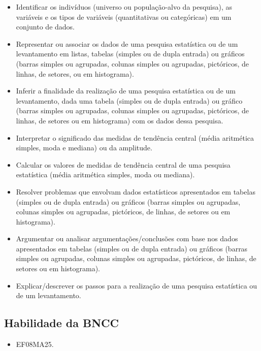 \begin{itemize}
\item Identificar os indivíduos (universo ou
população-alvo da pesquisa), as variáveis e os tipos de variáveis
(quantitativas ou categóricas) em um conjunto de dados.
\item
  Representar ou associar os dados de uma pesquisa estatística ou de um
  levantamento em listas, tabelas (simples ou de dupla entrada) ou
  gráficos (barras simples ou agrupadas, colunas simples ou agrupadas,
  pictóricos, de linhas, de setores, ou em histograma).
\item
  Inferir a finalidade da realização de uma pesquisa estatística ou de
  um levantamento, dada uma tabela (simples ou de dupla entrada) ou
  gráfico (barras simples ou agrupadas, colunas simples ou agrupadas,
  pictóricos, de linhas, de setores ou em histograma) com os dados dessa
  pesquisa.
\item
  Interpretar o significado das medidas de tendência central (média
  aritmética simples, moda e mediana) ou da amplitude.
\item
  Calcular os valores de medidas de tendência central de uma pesquisa
  estatística (média aritmética simples, moda ou mediana).
\item
  Resolver problemas que envolvam dados estatísticos apresentados em
  tabelas (simples ou de dupla entrada) ou gráficos (barras simples ou
  agrupadas, colunas simples ou agrupadas, pictóricos, de linhas, de
  setores ou em histograma).
\item
  Argumentar ou analisar argumentações/conclusões com base nos dados
  apresentados em tabelas (simples ou de dupla entrada) ou gráficos
  (barras simples ou agrupadas, colunas simples ou agrupadas,
  pictóricos, de linhas, de setores ou em histograma).
\item
  Explicar/descrever os passos para a realização de uma pesquisa
  estatística ou de um levantamento.
\end{itemize}

\subsection{Habilidade da BNCC}

\begin{itemize}
\item EF08MA25.
\end{itemize}



